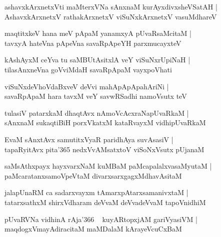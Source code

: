 \documentclass[twoside,12pt,openright]{book}
\newcounter{shloka}[chapter]
\begin{document}
\begin{shloka}%
ashavxkArxnetxVti maMterxVNa sAnxnaM kurAyxdivxsheVSatAH |\\
AshavxkArxnetxV rathakArxnetxV viSuNxkArxnetxV vasuMdhareV
\end{shloka}

\begin{shloka}%
maqtitxkeV hana meV pApaM yanamxyA pUvaRsaMcitaM |\\
tavxyA hateVna pApeVna savaRpApeYH parxmucayxteV 
\end{shloka}

\begin{shloka}%
kAshAyxM ceYva tu saMBUtAsitxlA veY viSuNxrUpiNaH |\\
tilasAnxneVna goVviMdaH savaRpApaM vayxpoVhati
\end{shloka}

\begin{shloka}%
viSuNxdeVhoVdaBxveV deVvi mahApApApahAriNi |\\
savaRpApaM hara tavxM veY savwRSadhi namoVsutx teV 
\end{shloka}

\begin{shloka}%
tulasiV patarxkaM dhaqtAvx nAmoVcAcxraNapUvaRkaM |\\
sAnxnaM sukaqtiBiH porxVkatxM kataRvayxM vidhipUvaRkaM 
\end{shloka}

\begin{shloka}%
EvaM sAnxtAvx samutitxVyaR paridhAya suvAsasiV |\\
tapaRyitAvx pita\char'365 nedxVvAMsatxtoV viSoNxVsutx pUjanaM 
\end{shloka}

\begin{shloka}%
saMsAthxpayx hayxvarxNaM kuMBaM paMcapalalxvasaMyutaM |\\
paMcaratanxsamoVpeVtaM divarxsarxgagxMdhavAsitaM 
\end{shloka}

\begin{shloka}%
jalapUnaRM ca sadarxvayxm tAmarxpAtarxsamanivxtaM |\\
tatarxsathxM shirxVdharam deVvaM deVvadeVvaM tapoVnidhiM 
\end{shloka}

\begin{shloka}%
pUvaRVNa vidhinA rAja\char'366 ~ kuyARtopxjAM gariVyasiVM |\\
maqdogxVmayAdiracitaM maMDalaM kArayeVcuCxBaM
\end{shloka}
\end{document}
